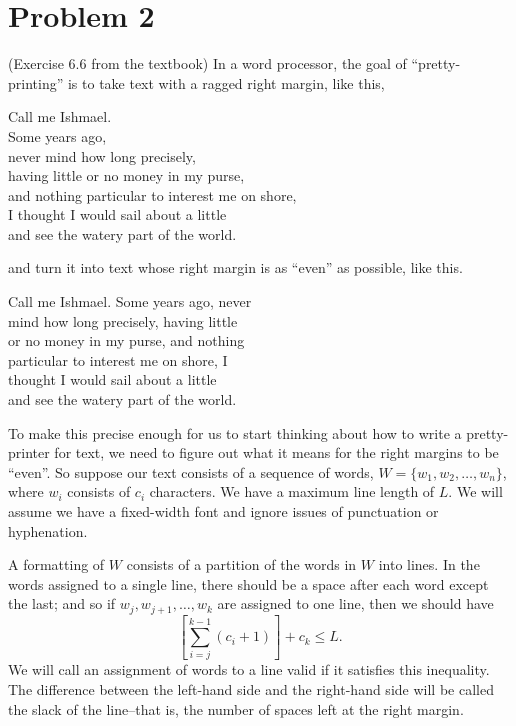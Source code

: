 \documentclass[12pt,a4paper]{article}
\begin{document}
\section{Problem 2}

(Exercise 6.6 from the textbook) In a word processor, the goal of ``pretty-printing'' is to take text with a ragged right margin, like this,

\begin{textbox}
Call me Ishmael.\\
Some years ago,\\
never mind how long precisely,\\
having little or no money in my purse,\\
and nothing particular to interest me on shore,\\
I thought I would sail about a little\\
and see the watery part of the world.
\end{textbox}

and turn it into text whose right margin is as ``even'' as possible, like this.

\begin{textbox}
Call me Ishmael. Some years ago, never\\
mind how long precisely, having little\\
or no money in my purse, and nothing\\
particular to interest me on shore, I\\
thought I would sail about a little\\
and see the watery part of the world.
\end{textbox}

To make this precise enough for us to start thinking about how to write a pretty-printer for text, we need to figure out what it means for the right margins to be ``even''. So suppose our text consists of a sequence of words, $W=\{w_1,w_2,\ldots,w_n\}$, where $w_i$ consists of $c_i$ characters. We have a maximum line length of $L$. We will assume we have a fixed-width font and ignore issues of punctuation or hyphenation.

A formatting of $W$ consists of a partition of the words in $W$ into lines. In the words assigned to a single line, there should be a space after each word except the last; and so if $w_j,w_{j+1},\ldots,w_k$ are assigned to one line, then we should have
\[
\left[\sum_{i=j}^{k-1}(c_i+1)\right]+c_k\le L.
\]
We will call an assignment of words to a line valid if it satisfies this inequality. The difference between the left-hand side and the right-hand side will be called the slack of the line--that is, the number of spaces left at the right margin.
\end{document}
